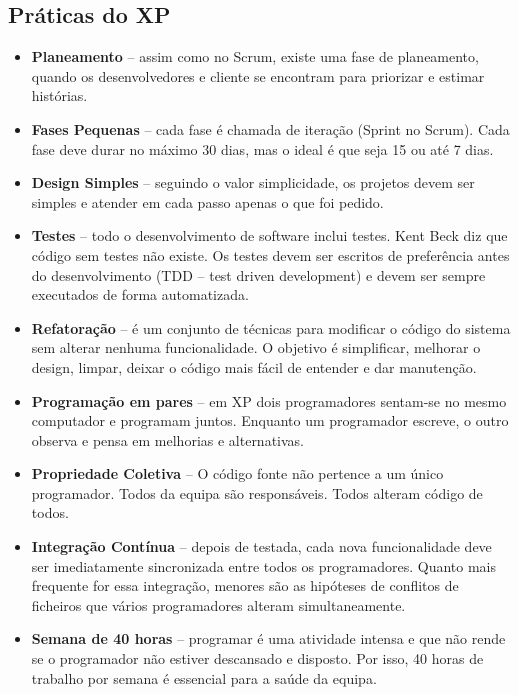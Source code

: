\subsection{Práticas do XP}
\begin{itemize}
    \item \textbf{Planeamento} – assim como no Scrum, existe uma fase de planeamento, quando os desenvolvedores e cliente se encontram para priorizar e estimar histórias.
    
    \item \textbf{Fases Pequenas} – cada fase é chamada de iteração (Sprint no Scrum). Cada fase deve durar no máximo 30 dias, mas o ideal é que seja 15 ou até 7 dias.
    
    \item \textbf{Design Simples} – seguindo o valor simplicidade, os projetos devem ser simples e atender em cada passo apenas o que foi pedido.
    
    \item \textbf{Testes} – todo o desenvolvimento de software inclui testes. Kent Beck diz que código sem testes não existe. Os testes devem ser escritos de preferência antes do desenvolvimento (TDD – test driven development) e devem ser sempre executados de forma automatizada.
    
    \item \textbf{Refatoração} – é um conjunto de técnicas para modificar o código do sistema sem alterar nenhuma funcionalidade. O objetivo é simplificar, melhorar o design, limpar, deixar o código mais fácil de entender e dar manutenção.
    
    \item \textbf{Programação em pares} – em XP dois programadores sentam-se no mesmo computador e programam juntos. Enquanto um programador escreve, o outro observa e pensa em melhorias e alternativas.
    
    \item \textbf{Propriedade Coletiva} – O código fonte não pertence a um único programador. Todos da equipa são responsáveis. Todos alteram código de todos.
    
    \item \textbf{Integração Contínua} – depois de testada, cada nova funcionalidade deve ser imediatamente sincronizada entre todos os programadores. Quanto mais frequente for essa integração, menores são as hipóteses de conflitos de ficheiros que vários programadores alteram simultaneamente.
    
    \item \textbf{Semana de 40 horas} – programar é uma atividade intensa e que não rende se o programador não estiver descansado e disposto. Por isso, 40 horas de trabalho por semana é essencial para a saúde da equipa.
    

\end{itemize}

